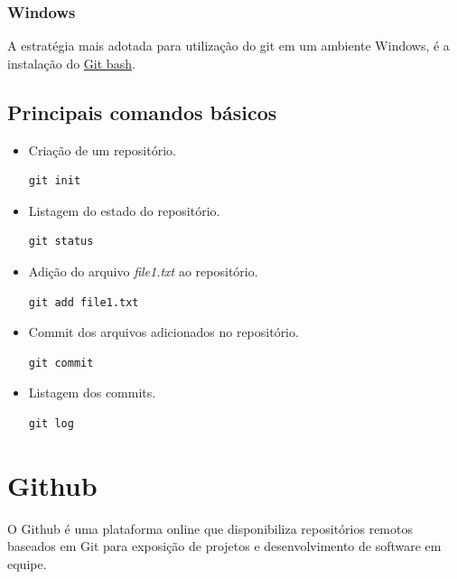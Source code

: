 \documentclass[
12pt,				%
openany,			%
twoside,			%
a4paper,			%
english,			%
french,				%
spanish,			%
brazil,				%
]{abntex2}
\begin{document}
\subsubsection{Windows}
A estratégia mais adotada para utilização do git em um ambiente Windows, é a instalação do \href{https://gitforwindows.org/}{Git bash}. 

\subsection{Principais comandos básicos}

\begin{itemize}
    \item Criação de um repositório. 
        \begin{lstlisting}[style=bash]
            git init
        \end{lstlisting}
    
    \item Listagem do estado do repositório. 
        \begin{lstlisting}[style=bash]
            git status
        \end{lstlisting}
        
    \item Adição do arquivo \textit{file1.txt} ao repositório. 
        \begin{lstlisting}[style=bash]
            git add file1.txt
        \end{lstlisting}
        
    \item Commit dos arquivos adicionados no repositório. 
        \begin{lstlisting}[style=bash]
            git commit
        \end{lstlisting}
        
    \item Listagem dos commits. 
        \begin{lstlisting}[style=bash]
            git log
        \end{lstlisting}
    
\end{itemize}
\section{Github}
O Github é uma plataforma online que disponibiliza repositórios remotos baseados em Git para exposição de projetos e desenvolvimento de software em equipe. 
\end{document}

